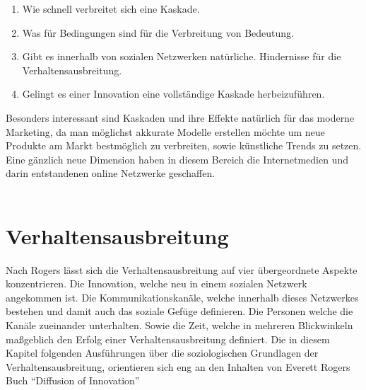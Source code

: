 \documentclass[12pt]{article}
\begin{document}
\begin{enumerate}
\item Wie schnell verbreitet sich eine Kaskade.
\item Was für Bedingungen sind für die Verbreitung von Bedeutung.
\item Gibt es innerhalb von sozialen Netzwerken natürliche. Hindernisse für die Verhaltensausbreitung.
\item Gelingt es einer Innovation eine vollständige Kaskade herbeizuführen.
\end{enumerate}
Besonders interessant sind Kaskaden und ihre Effekte natürlich für das moderne Marketing, da man möglichst akkurate Modelle erstellen möchte um neue Produkte am Markt bestmöglich zu verbreiten, sowie künstliche Trends zu setzen. Eine gänzlich neue Dimension haben in diesem Bereich die Internetmedien und darin entstandenen online Netzwerke geschaffen.\\\\



\section{Verhaltensausbreitung}
Nach Rogers lässt sich die Verhaltensausbreitung auf vier übergeordnete Aspekte konzentrieren. Die Innovation, welche neu in einem sozialen Netzwerk angekommen ist. Die Kommunikationskanäle, welche innerhalb dieses Netzwerkes bestehen und damit auch das soziale Gefüge definieren. Die Personen welche die Kanäle zueinander unterhalten. Sowie die Zeit, welche in mehreren Blickwinkeln maßgeblich den Erfolg einer Verhaltensausbreitung definiert. Die in diesem Kapitel folgenden Ausführungen über die soziologischen Grundlagen der Verhaltensausbreitung, orientieren sich eng an den Inhalten von Everett Rogers Buch "`Diffusion of Innovation"' \cite{Rogers03}
\end{document}
